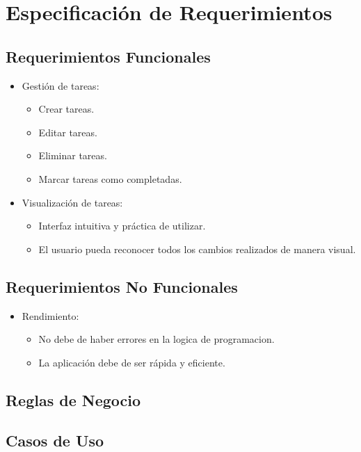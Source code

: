 	\chapter{Especificación de Requerimientos}
	\section{Requerimientos Funcionales}
    \begin{itemize}
        \item Gestión de tareas:
        \begin{itemize}
            \item Crear tareas.
            \item Editar tareas.
            \item Eliminar tareas.
            \item Marcar tareas como completadas.
        \end{itemize}
        \item Visualización de tareas:
        \begin{itemize}
            \item Interfaz intuitiva y práctica de utilizar.
            \item El usuario pueda reconocer todos los cambios realizados de manera visual.
        \end{itemize}
    \end{itemize}
	
	\section{Requerimientos No Funcionales}
	\begin{itemize}
        \item Rendimiento:
        \begin{itemize}
            \item No debe de haber errores en la logica de programacion.
            \item La aplicación debe de ser rápida y eficiente.
        \end{itemize}
    \end{itemize}
    \section{Reglas de Negocio}
	
	\section{Casos de Uso}
	
